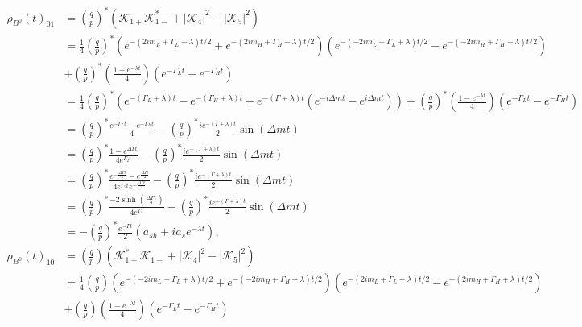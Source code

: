 \begin{align}
\rho_{B^0}(t)_{01} &= \left(\frac{q}{p}\right)^*(\mathcal{K}_{1+}\mathcal{K}_{1-}^* + |\mathcal{K}_4|^2 - |\mathcal{K}_5|^2) \nonumber \\
&= \frac{1}{4}\left(\frac{q}{p}\right)^*\left(e^{-(2im_L+\Gamma_L +\lambda)t/2}+e^{-(2im_H+\Gamma_H +\lambda)t/2}\right)\left(e^{-(-2im_L+\Gamma_L +\lambda)t/2}-e^{-(-2im_H+\Gamma_H +\lambda)t/2}\right) \nonumber \\
&+ \left(\frac{q}{p}\right)^*\left(\frac{1-e^{-\lambda t}}{4}\right)(e^{-\Gamma_L t} - e^{-\Gamma_H t}) \nonumber \\
&= \frac{1}{4}\left(\frac{q}{p}\right)^*\left(e^{-(\Gamma_L+\lambda)t}-e^{-(\Gamma_H+\lambda)t}+e^{-(\Gamma+\lambda)t}\left( e^{-i\Delta m t}-e^{i\Delta m t}\right)\right) + \left(\frac{q}{p}\right)^*\left(\frac{1-e^{-\lambda t}}{4}\right)(e^{-\Gamma_L t} - e^{-\Gamma_H t}) \nonumber \\
&= \left(\frac{q}{p}\right)^*\frac{e^{-\Gamma_L t}-e^{-\Gamma_H t}}{4}-\left(\frac{q}{p}\right)^*\frac{ie^{-(\Gamma + \lambda)t}}{2}\sin(\Delta m t) \nonumber \\
&= \left(\frac{q}{p}\right)^*\frac{1-e^{\Delta \Gamma t}}{4e^{\Gamma_2 t}}-\left(\frac{q}{p}\right)^*\frac{ie^{-(\Gamma + \lambda)t}}{2}\sin(\Delta m t) \nonumber \\
&= \left(\frac{q}{p}\right)^*\frac{e^{-\frac{\Delta \Gamma t}{2}}-e^{\frac{\Delta \Gamma t}{2}}}{4e^{\Gamma_2 t}e^{-\frac{\Delta \Gamma t}{2}}}-\left(\frac{q}{p}\right)^*\frac{ie^{-(\Gamma + \lambda)t}}{2}\sin(\Delta m t) \nonumber \\
&= \left(\frac{q}{p}\right)^*\frac{-2\sinh\left(\frac{\Delta \Gamma t}{2}\right)}{4e^{\Gamma t}}-\left(\frac{q}{p}\right)^*\frac{ie^{-(\Gamma + \lambda)t}}{2}\sin(\Delta m t) \nonumber \\
&=-\left(\frac{q}{p}\right)^*\frac{e^{-\Gamma t}}{2}\left(a_{sh}+ia_s e^{-\lambda t}\right), \\
\rho_{B^0}(t)_{10} &= \left(\frac{q}{p}\right)(\mathcal{K}_{1+}^*\mathcal{K}_{1-} + |\mathcal{K}_4|^2 - |\mathcal{K}_5|^2) \nonumber \\
&= \frac{1}{4}\left(\frac{q}{p}\right)\left(e^{-(-2im_L+\Gamma_L +\lambda)t/2}+e^{-(-2im_H+\Gamma_H +\lambda)t/2}\right)\left(e^{-(2im_L+\Gamma_L +\lambda)t/2}-e^{-(2im_H+\Gamma_H +\lambda)t/2}\right) \nonumber \\
&+ \left(\frac{q}{p}\right)\left(\frac{1-e^{-\lambda t}}{4}\right)(e^{-\Gamma_L t} - e^{-\Gamma_H t}) \nonumber \\

\end{align}
